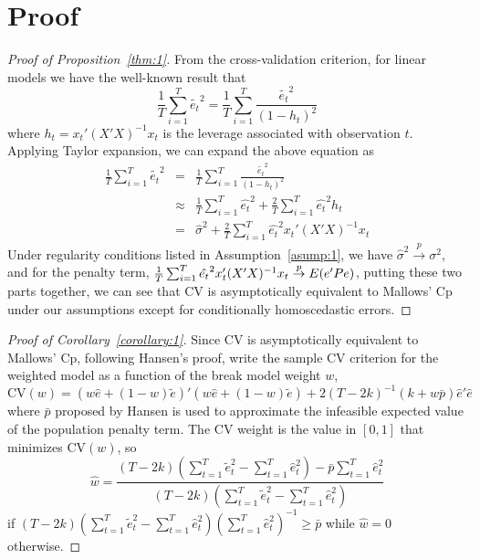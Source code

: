 \appendix
\section{Proof}

\begin{proof}[Proof of Proposition~\ref{thm:1}]
From the cross-validation criterion, for linear models we have the well-known result that
    \begin{equation*}
    \frac{1}{T} \sum_{i=1}^T \tilde{e_t}^2 = \frac{1}{T} \sum_{i=1}^T \frac{\tilde{e_t}^2}{(1-h_t)^2}
    \end{equation*}
where $h_t = x_t'(X'X)^{-1}x_t$ is the leverage associated with observation $t$. Applying Taylor expansion, we can expand the above equation as
    \begin{eqnarray*}
    \frac{1}{T} \sum_{i=1}^T \tilde{e_t}^2 & = & \frac{1}{T} \sum_{i=1}^T \frac{\tilde{e_t}^2}{(1-h_t)^2} \\
                                           & \approx & \frac{1}{T} \sum_{i=1}^T \hat{e_t}^2 + \frac{2}{T} \sum_{i=1}^T \hat{e_t}^2 h_t \\
                                           & = & \hat{\sigma}^2 + \frac{2}{T} \sum_{i=1}^T \hat{e_t}^2 x_t' (X'X)^{-1} x_t
    \end{eqnarray*}
Under regularity conditions listed in Assumption~\ref{asump:1}, we have $\hat{\sigma}^2 \stackrel{p}{\rightarrow} \sigma^{2}$, and for the penalty term,  $\frac{1}{T} \sum_{i=1}^T \hat{e_t}^2 x_t' (X'X)^{-1} x_t \stackrel{p}{\rightarrow} E(\boldmath{e'Pe})$, putting these two parts together, we can see that CV is asymptotically equivalent to Mallows' Cp under our assumptions except for conditionally homoscedastic errors.
\end{proof}

\begin{proof}[Proof of Corollary~\ref{corollary:1}]
Since CV is asymptotically equivalent to Mallows' Cp, following Hansen's \cite{hansen2009averaging} proof, write the sample CV criterion for the weighted model as a function of the break model weight $w$,
    \begin{equation*}
      \mathrm{CV}(w) = (w\hat{e} + (1-w)\tilde{e})'(w\hat{e} + (1-w)\tilde{e}) + 2(T - 2k)^{-1}(k + w\bar{p})\hat{e}'\hat{e}
    \end{equation*}
where $\bar{p}$ proposed by Hansen is used to approximate the infeasible expected value of the population penalty term. The CV weight is the value in $[0, 1]$ that minimizes $\mathrm{CV}(w)$, so
    \begin{equation*}
      \hat{w} = \frac{(T - 2k)(\sum_{t=1}^{T}\tilde{e}_{t}^{2} - \sum_{t=1}^{T}\hat{e}_{t}^{2}) - \bar{p}\sum_{t=1}^{T}\hat{e}_{t}^{2}}{(T - 2k)(\sum_{t=1}^{T}\tilde{e}_{t}^{2} - \sum_{t=1}^{T}\hat{e}_{t}^{2})}
    \end{equation*}
if $(T - 2k)(\sum_{t=1}^{T}\tilde{e}_{t}^{2} - \sum_{t=1}^{T}\hat{e}_{t}^{2})(\sum_{t=1}^{T}\hat{e}_{t}^{2})^{-1} \geq \bar{p}$ while $\hat{w} = 0$ otherwise.
\end{proof}


